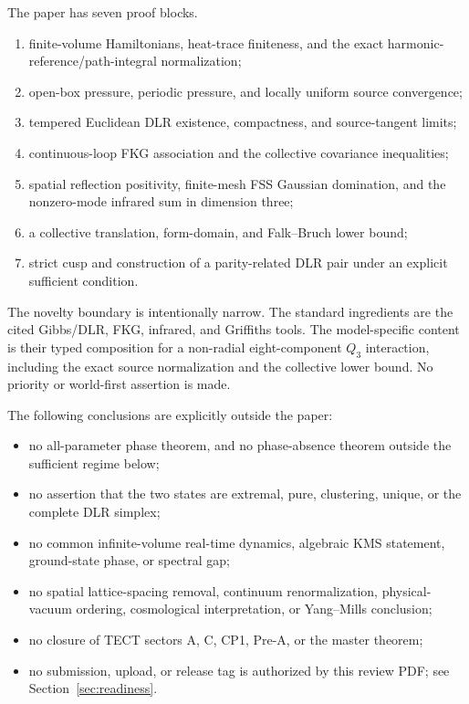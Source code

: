 \documentclass[11pt]{article}
\numberwithin{equation}{section}
\theoremstyle{definition}
\begin{document}
The paper has seven proof blocks.
\begin{enumerate}[label=\textup{(B\arabic*)},leftmargin=2.3em]
\item finite-volume Hamiltonians, heat-trace finiteness, and the exact
      harmonic-reference/path-integral normalization;
\item open-box pressure, periodic pressure, and locally uniform source
      convergence;
\item tempered Euclidean DLR existence, compactness, and source-tangent
      limits;
\item continuous-loop FKG association and the collective covariance
      inequalities;
\item spatial reflection positivity, finite-mesh FSS Gaussian domination,
      and the nonzero-mode infrared sum in dimension three;
\item a collective translation, form-domain, and Falk--Bruch lower bound;
\item strict cusp and construction of a parity-related DLR pair under an
      explicit sufficient condition.
\end{enumerate}

The novelty boundary is intentionally narrow.  The standard ingredients are
the cited Gibbs/DLR, FKG, infrared, and Griffiths tools.  The model-specific
content is their typed composition for a non-radial eight-component $Q_3$
interaction, including the exact source normalization and the collective
lower bound.  No priority or world-first assertion is made.

The following conclusions are explicitly outside the paper:
\begin{itemize}[leftmargin=2.3em]
\item no all-parameter phase theorem, and no phase-absence theorem outside
      the sufficient regime below;
\item no assertion that the two states are extremal, pure, clustering,
      unique, or the complete DLR simplex;
\item no common infinite-volume real-time dynamics, algebraic KMS statement,
      ground-state phase, or spectral gap;
\item no spatial lattice-spacing removal, continuum renormalization, physical-vacuum
      ordering, cosmological interpretation, or Yang--Mills conclusion;
\item no closure of TECT sectors A, C, CP1, Pre-A, or the master theorem;
\item no submission, upload, or release tag is authorized by this
      review PDF; see Section~\ref{sec:readiness}.
\end{itemize}
\end{document}
